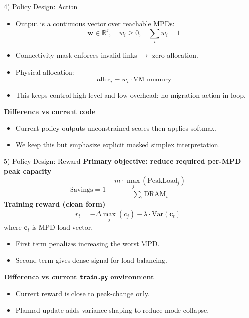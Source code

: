 \documentclass[10pt,aspectratio=169]{beamer}
\begin{document}
\begin{frame}{4) Policy Design: Action}
  \begin{itemize}
    \item Output is a continuous vector over reachable MPDs:
      \[
      \mathbf{w} \in \mathbb{R}^{k},\quad w_i \ge 0,\quad \sum_i w_i=1
      \]
    \item Connectivity mask enforces invalid links $\rightarrow$ zero allocation.
    \item Physical allocation:
      \[
      \text{alloc}_i = w_i \cdot \text{VM\_memory}
      \]
    \item This keeps control high-level and low-overhead: no migration action in-loop.
  \end{itemize}
  \vspace{0.4em}
  \textbf{Difference vs current code}
  \begin{itemize}
    \item Current policy outputs unconstrained scores then applies softmax.
    \item We keep this but emphasize explicit masked simplex interpretation.
  \end{itemize}
\end{frame}

\begin{frame}{5) Policy Design: Reward}
  \textbf{Primary objective: reduce required per-MPD peak capacity}
  \[
  \text{Savings} = 1 - \frac{m \cdot \max_j(\text{PeakLoad}_j)}{\sum_i \text{DRAM}_i}
  \]
  \vspace{0.4em}
  \textbf{Training reward (clean form)}
  \[
  r_t = -\Delta\max_j(c_j) - \lambda \cdot \mathrm{Var}(\mathbf{c}_t)
  \]
  where $\mathbf{c}_t$ is MPD load vector.
  \begin{itemize}
    \item First term penalizes increasing the worst MPD.
    \item Second term gives dense signal for load balancing.
  \end{itemize}
  \vspace{0.4em}
  \textbf{Difference vs current \texttt{train.py} environment}
  \begin{itemize}
    \item Current reward is close to peak-change only.
    \item Planned update adds variance shaping to reduce mode collapse.
  \end{itemize}
\end{frame}
\end{document}
